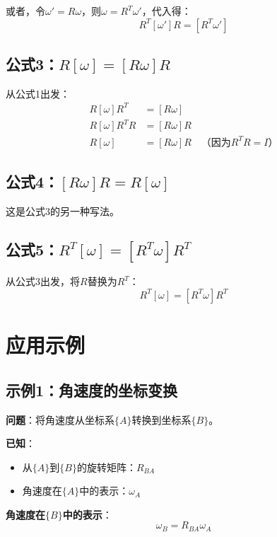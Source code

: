 \documentclass[12pt,a4paper]{article}
\begin{document}
或者，令$\omega' = R \omega$，则$\omega = R^T \omega'$，代入得：
\begin{equation}
R^T [\omega'] R = [R^T \omega']
\end{equation}

\subsection{公式3：$R [\omega] = [R \omega] R$}

从公式1出发：
\begin{align}
R [\omega] R^T &= [R \omega] \\
R [\omega] R^T R &= [R \omega] R \\
R [\omega] &= [R \omega] R \quad \text{（因为$R^T R = I$）}
\end{align}

\subsection{公式4：$[R \omega] R = R [\omega]$}

这是公式3的另一种写法。

\subsection{公式5：$R^T [\omega] = [R^T \omega] R^T$}

从公式3出发，将$R$替换为$R^T$：
\begin{equation}
R^T [\omega] = [R^T \omega] R^T
\end{equation}

\section{应用示例}

\subsection{示例1：角速度的坐标变换}

\textbf{问题}：将角速度从坐标系$\{A\}$转换到坐标系$\{B\}$。

\textbf{已知}：
\begin{itemize}
\item 从$\{A\}$到$\{B\}$的旋转矩阵：$R_{BA}$
\item 角速度在$\{A\}$中的表示：$\omega_A$
\end{itemize}

\textbf{角速度在$\{B\}$中的表示}：
\begin{equation}
\omega_B = R_{BA} \omega_A
\end{equation}
\end{document}
